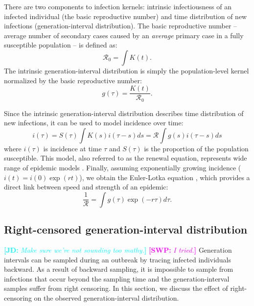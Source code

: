 \documentclass[12pt]{article}
\newcommand{\RR}{\ensuremath{{\mathcal R}}}
\newcommand{\comment}[3]{\textcolor{#1}{\textbf{[#2: }\textsl{#3}\textbf{]}}}
\newcommand{\jd}[1]{\comment{cyan}{JD}{#1}}
\newcommand{\swp}[1]{\comment{magenta}{SWP}{#1}}
\begin{document}
There are two components to infection kernels: intrinsic infectiousness of an infected individual (the basic reproductive number) and time distribution of new infections (generation-interval distribution).
The basic reproductive number -- average number of secondary cases caused by an \emph{average} primary case in a fully susceptible population -- is defined as: 
\begin{equation}
\RR_0 = \int K(t).
\end{equation}
The intrinsic generation-interval distribution is simply the population-level kernel normalized by the basic reproductive number:
\begin{equation}
g(\tau) = \frac{K(t)}{\RR_0}.
\end{equation}

Since the intrinsic generation-interval distribution describes time distribution of new infections, it can be used to model incidence over time:
\begin{equation}
i(\tau) = S(\tau) \int K(s) i(\tau-s) ds = \RR \int g(s) i(\tau-s) ds
\end{equation}
where $i(\tau)$ is incidence at time $\tau$ and $S(\tau)$ is the proportion of the population susceptible.
This model, also referred to as the renewal equation, represents wide range of epidemic models \citep{heesterbeek1996concept, diekmann2000mathematical, roberts2004modelling, aldis2005integral, wallinga2007generation, roberts2007model}.
Finally, assuming exponentially growing incidence ($i(t) = i(0) \exp(r t)$), we obtain the Euler-Lotka equation \citep{lotka1907relation}, which provides a direct link between speed and strength of an epidemic:
\begin{equation}
\frac{1}{\RR} = \int g(\tau) \exp(-r \tau) d\tau.
\end{equation}

\subsection{Right-censored generation-interval distribution}

\jd{Make sure we're not sounding too mathy.}
\swp{I tried.}
Generation intervals can be sampled during an outbreak by tracing infected individuals backward.
As a result of backward sampling, it is impossible to sample from infections that occur beyond the sampling time and the generation-interval samples suffer from right censoring.
In this section, we discuss the effect of right-censoring on the observed generation-interval distribution.
\end{document}
